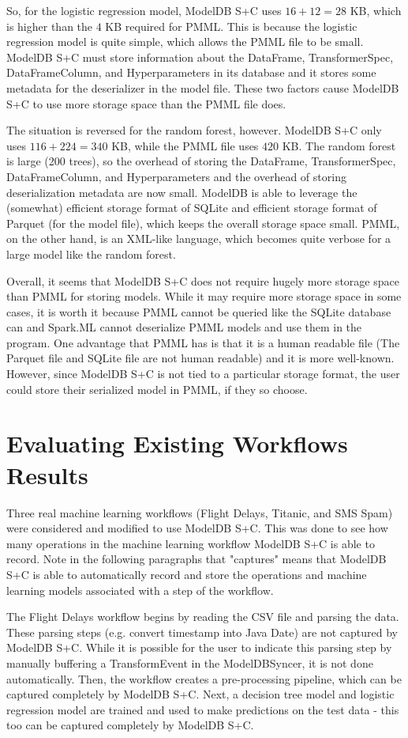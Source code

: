  So, for the logistic regression model, ModelDB S+C uses $16 + 12 = 28$ KB, which is
 higher than the $4$ KB required for PMML. This is because the logistic regression model
 is quite simple, which allows the PMML file to be small. ModelDB S+C must store information
 about the DataFrame, TransformerSpec, DataFrameColumn, and Hyperparameters in its database and
 it stores some metadata for the deserializer in the model file. These two factors cause ModelDB S+C
 to use more storage space than the PMML file does.

 The situation is reversed for the random forest, however. ModelDB S+C only uses $116 + 224 = 340$ KB,
 while the PMML file uses $420$ KB. The random forest is large (200 trees), so the overhead of storing the DataFrame,
 TransformerSpec, DataFrameColumn, and Hyperparameters and the overhead of storing deserialization metadata are now small.
 ModelDB is able to leverage the (somewhat) efficient storage format of SQLite and efficient storage format of Parquet (for 
 the model file), which keeps the overall storage space small. PMML, on the other hand, is an XML-like language, which becomes
 quite verbose for a large model like the random forest.

 Overall, it seems that ModelDB S+C does not require hugely more storage space than PMML for storing models. 
 While it may require more storage space in some cases, it is worth it because PMML cannot be queried like the SQLite
 database can and Spark.ML cannot deserialize PMML models and use them in the program. One advantage that PMML
 has is that it is a human readable file (The Parquet file and SQLite file are not human readable) and it is more well-known. 
 However, since ModelDB S+C is not tied to a particular storage format, the user could store their serialized model in PMML, 
 if they so choose.

\section{Evaluating Existing Workflows Results}
Three real machine learning workflows (Flight Delays, Titanic, and SMS Spam) were
considered and modified to use ModelDB S+C. This was done to see how many operations in the
machine learning workflow ModelDB S+C is able to record. Note in the following paragraphs that "captures"
means that ModelDB S+C is able to automatically record and store the operations and machine learning models
associated with a step of the workflow.

The Flight Delays workflow begins by reading the CSV file and parsing the data. These parsing
steps (e.g. convert timestamp into Java Date) are not captured by ModelDB S+C. While it is possible
for the user to indicate this parsing step by manually buffering a TransformEvent in the ModelDBSyncer,
it is not done automatically. Then, the workflow creates a pre-processing pipeline, which can be captured
completely by ModelDB S+C. Next, a decision tree model and logistic regression model are trained and
used to make predictions on the test data - this too can be captured completely by ModelDB S+C.

